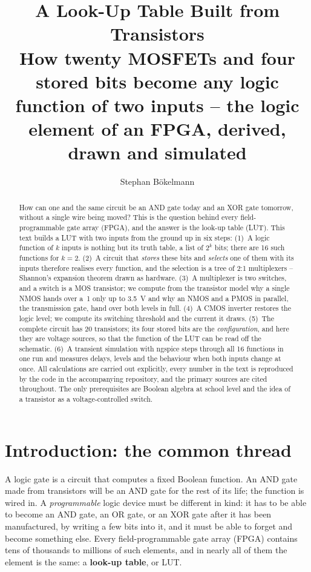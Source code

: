 \documentclass[11pt,a4paper]{article}
\title{\textbf{A Look-Up Table Built from Transistors}\\[0.3em]
\large How twenty MOSFETs and four stored bits become any logic function
of two inputs -- the logic element of an FPGA, derived, drawn and simulated}
\author{Stephan Bökelmann}
\date{}
\begin{document}
\maketitle
\thispagestyle{empty}

\begin{abstract}
\noindent
How can one and the same circuit be an AND gate today and an XOR gate
tomorrow, without a single wire being moved? This is the question behind
every field-programmable gate array (FPGA), and the answer is the
look-up table (LUT). This text builds a LUT with two inputs from the
ground up in six steps: (1)~A logic function of $k$ inputs is nothing but
its truth table, a list of $2^k$ bits; there are 16 such functions for
$k=2$. (2)~A circuit that \emph{stores} these bits and \emph{selects}
one of them with its inputs therefore realises every function, and the
selection is a tree of 2:1 multiplexers -- Shannon's expansion theorem
drawn as hardware. (3)~A multiplexer is two switches, and a switch is a
MOS transistor; we compute from the transistor model why a single NMOS
hands over a~1 only up to \SI{3.5}{V} and why an NMOS and a PMOS in
parallel, the transmission gate, hand over both levels in full.
(4)~A CMOS inverter restores the logic level; we compute its switching
threshold and the current it draws. (5)~The complete circuit has 20
transistors; its four stored bits are the \emph{configuration}, and here
they are voltage sources, so that the function of the LUT can be read
off the schematic. (6)~A transient simulation with ngspice steps through
all 16 functions in one run and measures delays, levels and the
behaviour when both inputs change at once. All calculations are carried
out explicitly, every number in the text is reproduced by the code in the
accompanying repository, and the primary sources are cited throughout.
The only prerequisites are Boolean algebra at school level and the idea
of a transistor as a voltage-controlled switch.
\end{abstract}

\tableofcontents
\vspace{1em}

\section{Introduction: the common thread}

A logic gate is a circuit that computes a fixed Boolean function. An AND
gate made from transistors will be an AND gate for the rest of its life;
the function is wired in. A \emph{programmable} logic device must be
different in kind: it has to be able to become an AND gate, an OR gate,
or an XOR gate after it has been manufactured, by writing a few bits into
it, and it must be able to forget and become something else. Every
field-programmable gate array (FPGA) contains tens of thousands to
millions of such elements, and in nearly all of them the element is the
same: a \textbf{look-up table}, or LUT.
\end{document}
